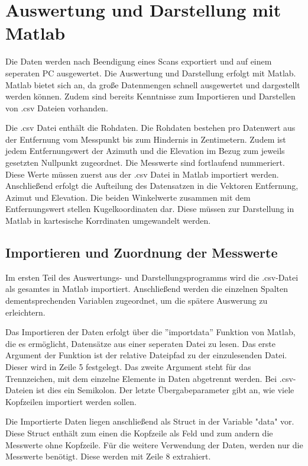 

\chapter{Auswertung und Darstellung mit Matlab}\label{chap:auswertung_matlab}

Die Daten werden nach Beendigung eines Scans exportiert und auf einem seperaten PC ausgewertet. Die Auswertung und Darstellung erfolgt mit Matlab. Matlab bietet sich an, da große Datenmengen schnell ausgewertet und dargestellt werden können. Zudem sind bereits Kenntnisse zum Importieren und Darstellen von .csv Dateien vorhanden. 

Die .csv Datei enthält die Rohdaten. Die Rohdaten bestehen pro Datenwert aus der Entfernung vom Messpunkt bis zum Hindernis in Zentimetern. Zudem ist jedem Entfernungswert der Azimuth und die Elevation im Bezug zum jeweils gesetzten Nullpunkt zugeordnet. Die Messwerte sind fortlaufend nummeriert. 
Diese Werte müssen zuerst aus der .csv Datei in Matlab importiert werden. Anschließend erfolgt die Aufteilung des Datensatzen in die Vektoren Entfernung, Azimut und Elevation.
Die beiden Winkelwerte zusammen mit dem Entfernungswert stellen Kugelkoordinaten dar. Diese müssen zur Darstellung in Matlab in kartesische Korrdinaten umgewandelt werden. 



\section{Importieren und Zuordnung der Messwerte}

Im ersten Teil des Auswertungs- und Darstellungsprogramms wird die .csv-Datei als gesamtes in Matlab importiert. Anschließend werden die einzelnen Spalten dementsprechenden Variablen zugeordnet, um die spätere Auswerung zu erleichtern.

Das Importieren der Daten erfolgt über die ''importdata'' Funktion von Matlab, die es ermöglicht, Datensätze aus einer seperaten Datei zu lesen. Das erste Argument der Funktion ist der relative Dateipfad zu der einzulesenden Datei. Dieser wird in Zeile 5 festgelegt. Das zweite Argument steht für das Trennzeichen, mit dem einzelne Elemente in Daten abgetrennt werden. Bei .csv-Dateien ist dies ein Semikolon. Der letzte Übergabeparameter gibt an, wie viele Kopfzeilen importiert werden sollen.

Die Importierte Daten liegen anschließend als Struct in der Variable "data" vor. Diese Struct enthält zum einen die Kopfzeile als Feld und zum andern die Messwerte ohne Kopfzeile. Für die weitere Verwendung der Daten, werden nur die Messwerte benötigt. Diese werden mit Zeile 8 extrahiert. 

